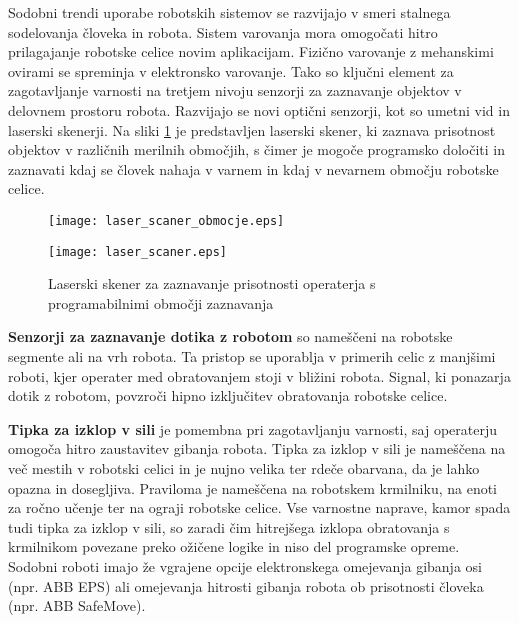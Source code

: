 Sodobni trendi uporabe robotskih sistemov se razvijajo v smeri
stalnega sodelovanja človeka in robota. Sistem varovanja mora
omogočati hitro prilagajanje robotske celice novim aplikacijam.
Fizično varovanje z mehanskimi ovirami se spreminja v elektronsko
varovanje. Tako so ključni element za zagotavljanje varnosti na
tretjem nivoju senzorji za zaznavanje objektov v delovnem prostoru
robota. Razvijajo se novi optični senzorji, kot so umetni vid in
laserski skenerji. Na sliki \ref{laser_scaner} je predstavljen
laserski skener, ki zaznava prisotnost objektov v različnih merilnih
območjih, s čimer je mogoče programsko določiti in zaznavati kdaj se
človek nahaja v varnem in kdaj v nevarnem območju robotske celice.
\begin{figure}[h]
\begin{minipage}[c]{0.4\columnwidth}
\centering
\texttt{[image: laser\_scaner\_obmocje.eps]}
\end{minipage}
\begin{minipage}[c]{0.6\columnwidth}
\centering
\texttt{[image: laser\_scaner.eps]}
\end{minipage}
\caption{\label{laser_scaner}Laserski skener za zaznavanje
prisotnosti operaterja s programabilnimi območji zaznavanja}
\end{figure}


\textbf{Senzorji za zaznavanje dotika z robotom} so nameščeni na
robotske segmente ali na vrh robota. Ta pristop se uporablja v
primerih celic z manjšimi roboti, kjer operater med obratovanjem
stoji v bližini robota. Signal, ki ponazarja dotik z robotom,
povzroči hipno izključitev obratovanja robotske celice.

\vspace{5mm}

\textbf{Tipka za izklop v sili} je pomembna pri zagotavljanju
varnosti, saj operaterju omogoča hitro zaustavitev gibanja robota.
Tipka za izklop v sili je nameščena na več mestih v robotski celici
in je nujno velika ter rdeče obarvana, da je lahko opazna in
dosegljiva. Praviloma je nameščena na robotskem krmilniku, na enoti
za ročno učenje ter na ograji robotske celice. Vse varnostne
naprave, kamor spada tudi tipka za izklop v sili, so zaradi čim
hitrejšega izklopa obratovanja s krmilnikom povezane preko ožičene
logike in niso del programske opreme. Sodobni roboti imajo že
vgrajene opcije elektronskega omejevanja gibanja osi (npr. ABB EPS)
ali omejevanja hitrosti gibanja robota ob prisotnosti človeka (npr.
ABB SafeMove).

